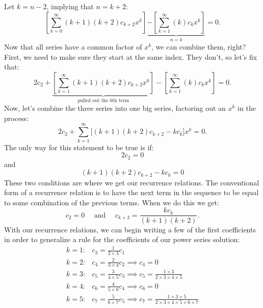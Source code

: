 \documentclass[a4paper,12pt]{article}
\begin{document}
Let $k=n-2$, implying that $n=k+2$:
$$ \left[\sum_{k=0}^{\infty}(k+1)(k+2)c_{k+2}x^{k}\right]\underbrace{ -\left[\sum_{k=1}^{\infty}(k)c_kx^{k}\right]}_{n=k} = 0. $$
Now that all series have a common factor of $x^{k}$, we can combine them, right? First, we need to make sure they start at the same index. They don't, so let's fix that:
$$ 2c_2 + \underbrace{\left[\sum_{k=1}^{\infty}(k+1)(k+2)c_{k+2}x^{k}\right]}_{\text{pulled out the 0th term}} -\left[\sum_{k=1}^{\infty}(k)c_kx^{k}\right] = 0. $$
Now, let's combine the three series into one big series, factoring out an $x^k$ in the process:
$$ 2c_2 + \sum_{k=1}^{\infty}\bigg[(k+1)(k+2)c_{k+2} - kc_k\bigg]x^k = 0. $$
The only way for this statement to be true is if:
$$ 2c_2= 0 $$
and
$$ (k+1)(k+2)c_{k+2} - kc_k = 0 $$
These two conditions are where we get our recurrence relations. The conventional form of a recurrence relation is to have the next term in the sequence to be equal to some combination of the previous terms. When we do this we get:
$$ c_2 = 0 \quad \text{ and }\quad c_{k+2} = \frac{kc_k}{(k+1)(k+2)}.  $$
With our recurrence relations, we can begin writing a few of the first coefficients in order to generalize a rule for the coefficients of our power series solution:
 $$ \begin{array}{rl}
k=1: & c_3 = \frac{1}{2\times 3} c_1\\

k=2: & c_4 = \frac{2}{3\times 4}c_2 \implies c_4=0 \\

k=3: & c_5 = \frac{3}{4\times5}c_3 \implies c_5 = \frac{1\times3}{2\times3\times4\times5} \\
k=4: & c_6 = \frac{4}{5\times6}c_4 \implies c_6 = 0 \\

k=5: & c_7 = \frac{5}{6\times7}c_5 \implies c_7 = \frac{1\times3\times5}{2\times3\times4\times5\times6\times7}
\end{array} $$
\end{document}
